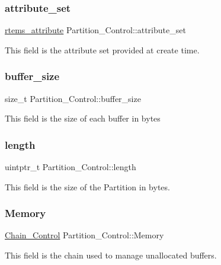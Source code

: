 \subsubsection{\texorpdfstring{attribute\_set}{attribute\_set}}
{\footnotesize\ttfamily \mbox{\hyperlink{group__ClassicAttributes_gaea40313cf78ed843e09c4315d0a10f79}{rtems\+\_\+attribute}} Partition\+\_\+\+Control\+::attribute\+\_\+set}

This field is the attribute set provided at create time. \mbox{\label{structPartition__Control_ab265b9126c5c76e1bd70adbeb15b7605}} 
\subsubsection{\texorpdfstring{buffer\_size}{buffer\_size}}
{\footnotesize\ttfamily size\+\_\+t Partition\+\_\+\+Control\+::buffer\+\_\+size}

This field is the size of each buffer in bytes \mbox{\label{structPartition__Control_a8c76fab1a9ac8f5ecc56956be0a0adf1}} 
\subsubsection{\texorpdfstring{length}{length}}
{\footnotesize\ttfamily uintptr\+\_\+t Partition\+\_\+\+Control\+::length}

This field is the size of the Partition in bytes. \mbox{\label{structPartition__Control_ab284c18e4197f603951ede02b7e25c03}} 
\subsubsection{\texorpdfstring{Memory}{Memory}}
{\footnotesize\ttfamily \mbox{\hyperlink{unionChain__Control}{Chain\+\_\+\+Control}} Partition\+\_\+\+Control\+::\+Memory}

This field is the chain used to manage unallocated buffers. \mbox{\label{structPartition__Control_a7379b6a5aeb440a8618573b6d63eb620}} 

